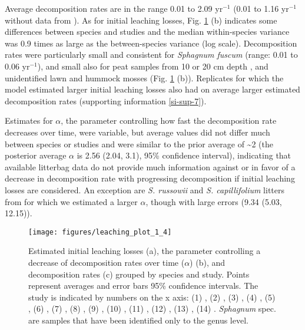 \documentclass[bg, manuscript]{copernicus}
\begin{document}
Average decomposition rates are in the range 0.01 to 2.09 yr\(^{-1}\) (0.01 to 1.16 yr\(^{-1}\) without data from \citet{Bengtsson.2017}). As for initial leaching losses, Fig. \ref{fig:out-mm36-1-p5} (b) indicates some differences between species and studies and the median within-species variance was 0.9 times as large as the between-species variance (log scale). Decomposition rates were particularly small and consistent for \emph{Sphagnum fuscum} (range: 0.01 to 0.06 yr\(^{-1}\)), and small also for peat samples from 10 or 20 cm depth \citep{Prevost.1997}, and unidentified lawn and hummock mosses \citep{Bartsch.1985} (Fig. \ref{fig:out-mm36-1-p5} (b)). Replicates for which the model estimated larger initial leaching losses also had on average larger estimated decomposition rates (supporting information \ref{si-sup-7}).

Estimates for \(\alpha\), the parameter controlling how fast the decomposition rate decreases over time, were variable, but average values did not differ much between species or studies and were similar to the prior average of \textasciitilde2 (the posterior average \(\alpha\) is 2.56 (2.04, 3.1), 95\% confidence interval), indicating that available litterbag data do not provide much information against or in favor of a decrease in decomposition rate with progressing decomposition if initial leaching losses are considered. An exception are \emph{S. russowii} and \emph{S. capillifolium} litters from \citet{Hagemann.2015} for which we estimated a larger \(\alpha\), though with large errors (9.34 (5.03, 12.15)).



\begin{figure}[H]

{\centering \texttt{[image: figures/leaching\_plot\_1\_4]} 

}

\caption{Estimated initial leaching losses (a), the parameter controlling a decrease of decomposition rates over time (\(\alpha\)) (b), and decomposition rates (c) grouped by species and study. Points represent averages and error bars 95\% confidence intervals. The study is indicated by numbers on the x axis: (1) \citet{Asada.2005b}, (2) \citet{Bartsch.1985}, (3) \citet{Breeuwer.2008}, (4) \citet{Golovatskaya.2017}, (5) \citet{Hagemann.2015}, (6) \citet{Johnson.1991}, (7) \citet{Makila.2018}, (8) \citet{Prevost.1997}, (9) \citet{Scheffer.2001}, (10) \citet{Strakova.2010}, (11) \citet{Szumigalski.1996}, (12) \citet{Thormann.2001}, (13) \citet{Trinder.2008}, (14) \citet{Vitt.1990}. \emph{Sphagnum} spec. are samples that have been identified only to the genus level.}\label{fig:out-mm36-1-p5}
\end{figure}
\end{document}
